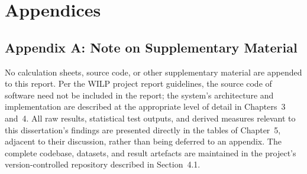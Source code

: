 \chapter*{Appendices}

\section*{Appendix A: Note on Supplementary Material}

No calculation sheets, source code, or other supplementary material are
appended to this report. Per the WILP project report guidelines, the
source code of software need not be included in the report; the system's
architecture and implementation are described at the appropriate level
of detail in Chapters~3 and~4. All raw results, statistical test
outputs, and derived measures relevant to this dissertation's findings
are presented directly in the tables of Chapter~5, adjacent to their
discussion, rather than being deferred to an appendix. The complete
codebase, datasets, and result artefacts are maintained in the project's
version-controlled repository described in Section~4.1.
